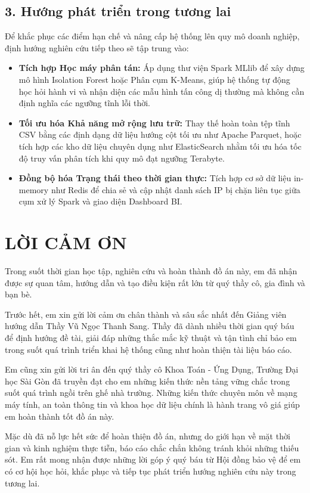 \documentclass[12pt,a4paper]{report}
\begin{document}
\section*{3. Hướng phát triển trong tương lai}
Để khắc phục các điểm hạn chế và nâng cấp hệ thống lên quy mô doanh nghiệp, định hướng nghiên cứu tiếp theo sẽ tập trung vào:
\begin{itemize}
    \item \textbf{Tích hợp Học máy phân tán:} Áp dụng thư viện Spark MLlib để xây dựng mô hình Isolation Forest hoặc Phân cụm K-Means, giúp hệ thống tự động học hỏi hành vi và nhận diện các mẫu hình tấn công dị thường mà không cần định nghĩa các ngưỡng tĩnh lỗi thời.
    \item \textbf{Tối ưu hóa Khả năng mở rộng lưu trữ:} Thay thế hoàn toàn tệp tĩnh CSV bằng các định dạng dữ liệu hướng cột tối ưu như Apache Parquet, hoặc tích hợp các kho dữ liệu chuyên dụng như ElasticSearch nhằm tối ưu hóa tốc độ truy vấn phân tích khi quy mô đạt ngưỡng Terabyte.
    \item \textbf{Đồng bộ hóa Trạng thái theo thời gian thực:} Tích hợp cơ sở dữ liệu in-memory như Redis để chia sẻ và cập nhật danh sách IP bị chặn liên tục giữa cụm xử lý Spark và giao diện Dashboard BI.
\end{itemize}

\chapter*{LỜI CẢM ƠN}
Trong suốt thời gian học tập, nghiên cứu và hoàn thành đồ án này, em đã nhận được sự quan tâm, hướng dẫn và tạo điều kiện rất lớn từ quý thầy cô, gia đình và bạn bè.

Trước hết, em xin gửi lời cảm ơn chân thành và sâu sắc nhất đến Giảng viên hướng dẫn Thầy Vũ Ngọc Thanh Sang. Thầy đã dành nhiều thời gian quý báu để định hướng đề tài, giải đáp những thắc mắc kỹ thuật và tận tình chỉ bảo em trong suốt quá trình triển khai hệ thống cũng như hoàn thiện tài liệu báo cáo.

Em cũng xin gửi lời tri ân đến quý thầy cô Khoa Toán - Ứng Dụng, Trường Đại học Sài Gòn đã truyền đạt cho em những kiến thức nền tảng vững chắc trong suốt quá trình ngồi trên ghế nhà trường. Những kiến thức chuyên môn về mạng máy tính, an toàn thông tin và khoa học dữ liệu chính là hành trang vô giá giúp em hoàn thành tốt đồ án này.

Mặc dù đã nỗ lực hết sức để hoàn thiện đồ án, nhưng do giới hạn về mặt thời gian và kinh nghiệm thực tiễn, báo cáo chắc chắn không tránh khỏi những thiếu sót. Em rất mong nhận được những lời góp ý quý báu từ Hội đồng bảo vệ để em có cơ hội học hỏi, khắc phục và tiếp tục phát triển hướng nghiên cứu này trong tương lai.
\end{document}
